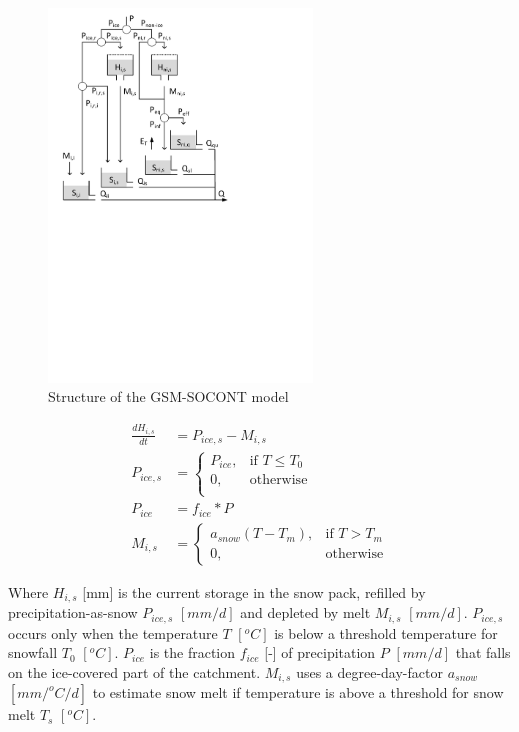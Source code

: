 { 																	%
\begin{figure}
\includegraphics[trim=1cm 14cm 7cm 1cm,width=7cm,keepaspectratio]{./files/43_schematic.pdf}
\caption{Structure of the GSM-SOCONT model} \label{fig:43_schematic}
\end{figure}

\begin{align}
	\frac{dH_{i,s}}{dt} &= P_{ice,s} - M_{i,s}\\
	P_{ice,s} &= \begin{cases}
		P_{ice}, &\text{if } T \leq T_0 \\
		0, & \text{otherwise} \\
	\end{cases} \\
	P_{ice} &= f_{ice}*P \\
	M_{i,s} &= \begin{cases}
		a_{snow}(T-T_m), &\text{if } T > T_m \\
		0, &\text{otherwise} 
	\end{cases} 
\end{align}

Where $H_{i,s}$ [mm] is the current storage in the snow pack, refilled by precipitation-as-snow $P_{ice,s}$ $[mm/d]$ and depleted by melt $M_{i,s}$ $[mm/d]$.
$P_{ice,s}$ occurs only when the temperature $T$ $[^oC]$ is below a threshold temperature for snowfall $T_0$ $[^oC]$.
$P_{ice}$ is the fraction $f_{ice}$ [-] of precipitation $P$ $[mm/d]$ that falls on the ice-covered part of the catchment.
$M_{i,s}$ uses a degree-day-factor $a_{snow}$ $[mm/^oC/d]$ to estimate snow melt if temperature is above a threshold for snow melt $T_s$ $[^oC]$.

} %

